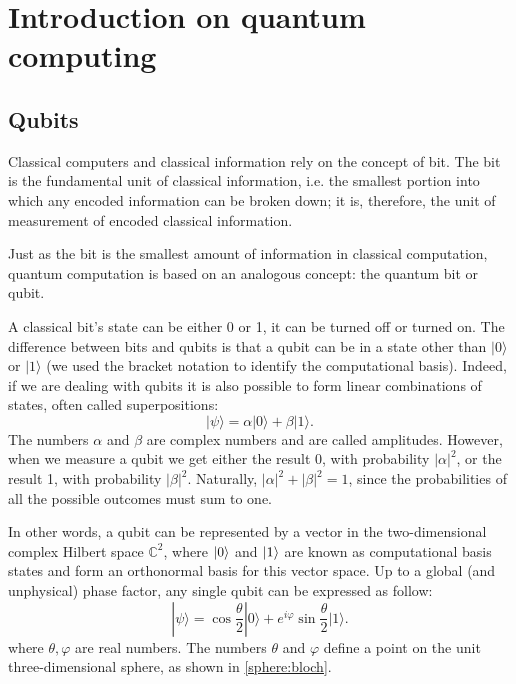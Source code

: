 \chapter{Introduction on quantum computing}
\section{Qubits}
Classical computers and classical information rely on the concept of bit. The bit is the fundamental unit of classical information, i.e. the smallest portion into which any encoded information can be broken down; it is, therefore, the unit of measurement of encoded classical information.

Just as the bit is the smallest amount of information in classical computation, quantum computation is based on an analogous concept: the quantum bit or qubit.

A classical bit's state can be either 0 or 1, it can be turned off or turned on. The difference between bits and qubits is that a qubit can be in a state other than $|0\rangle$ or $|1\rangle$ (we used the bracket notation to identify the computational basis).
Indeed, if we are dealing with qubits it is also possible to form linear combinations of states, often called superpositions:
$$
|\psi\rangle=\alpha|0\rangle+\beta|1\rangle .
$$
The numbers $\alpha$ and $\beta$ are complex numbers and are called amplitudes.
However, when we measure a qubit we get either the result 0, with probability $|\alpha|^{2}$, or the result 1, with probability $|\beta|^{2}$. Naturally, $|\alpha|^{2}+|\beta|^{2}=1$, since the probabilities of all the possible outcomes must sum to one. 

In other words, a qubit can be represented by a vector in the two-dimensional complex Hilbert space $\mathbb{C}^2$, where $\ket{0}$ and $\ket{1}$ are known as computational basis states and form an orthonormal basis for this vector space.
Up to a global (and unphysical) phase factor, any single qubit can be expressed as follow: 
$$
|\psi\rangle=\cos \frac{\theta}{2}|0\rangle+e^{i \varphi} \sin \frac{\theta}{2}|1\rangle .
$$
where $\theta, \varphi$ are real numbers. 
The numbers $\theta$ and $\varphi$ define a point on the unit three-dimensional sphere, as shown in \ref{sphere:bloch}.

